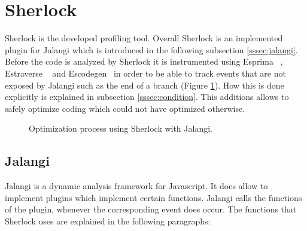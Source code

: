 \section{Sherlock}
\label{sec:sherlock}
Sherlock is the developed profiling tool. Overall Sherlock is an implemented plugin for Jalangi which is introduced in the following subsection \ref{sssec:jalangi}. Before the code is analyzed by Sherlock it is instrumented using Esprima ~\cite{esprima}, Estraverse ~\cite{estraverse} and Escodegen~\cite{escodegen} in order to be able to track events that are not exposed by Jalangi such as the end of a branch (Figure \ref{fig:architecture}). How this is done explicitly is explained in subsection \ref{sssec:condition}. This additions allows to safely optimize coding which could not have optimized otherwise. 


\begin{figure}[htbp]
\centering
{}
\caption{Optimization process using Sherlock with Jalangi.}\label{fig:architecture}
\end{figure}

\subsection{Jalangi}
Jalangi is a dynamic analysis framework for Javascript. It does allow to implement plugins which implement certain functions. Jalangi calls the functions of the plugin, whenever the corresponding event does occur. The functions that Sherlock uses are explained in the following paragraphs:

